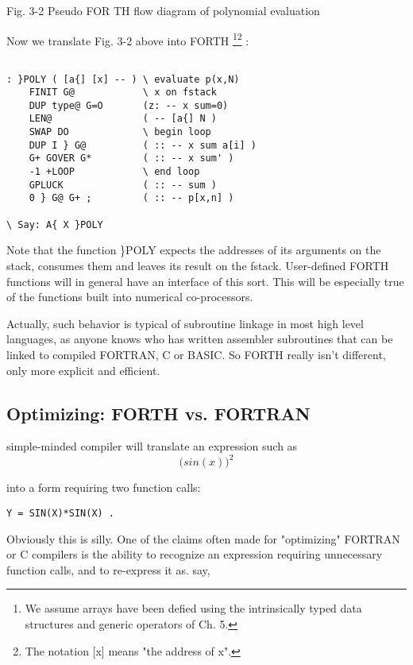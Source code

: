  

Fig. 3-2 Pseudo FOR TH flow diagram of polynomial evaluation

Now we translate Fig. 3-2 above into FORTH \footnote{We assume arrays have been
defied using the intrinsically typed data structures and generic operators of
Ch. 5.}\footnote{The notation [x] means "the address of x".} :

\begin{verbatim}

: }POLY ( [a{] [x] -- ) \ evaluate p(x,N)
    FINIT G@            \ x on fstack
    DUP type@ G=O       (z: -- x sum=0)
    LEN@                ( -- [a{] N )
    SWAP DO             \ begin loop
    DUP I } G@          ( :: -- x sum a[i] )
    G+ GOVER G*         ( :: -- x sum' )
    -1 +LOOP            \ end loop
    GPLUCK              ( :: -- sum )
    0 } G@ G+ ;         ( :: -- p[x,n] )

\ Say: A{ X }POLY

\end{verbatim}

Note that the function \}POLY expects the addresses of its arguments on the
stack, consumes them and leaves its result on the fstack. User-defined FORTH
functions will in general have an interface of this sort. This will be
especially true of the functions built into numerical co-processors.

Actually, such behavior is typical of subroutine linkage in most high
level languages, as anyone knows who has written assembler subroutines that can
be linked to compiled FORTRAN, C or BASIC.
So FORTH really isn't different, only more explicit and efficient.

\subsection{Optimizing: FORTH vs. FORTRAN}
 simple-minded compiler will translate an expression such as
\begin{equation}
     \Big( sin(x) \Big)^2
\end{equation}

into a form requiring two function calls:

\begin{verbatim}
Y = SIN(X)*SIN(X) .
\end{verbatim}

Obviously this is silly. One of the claims often made for "optimizing" FORTRAN
or C compilers is the ability to recognize an
expression requiring unnecessary function calls, and to re-express
it as. say,
  
